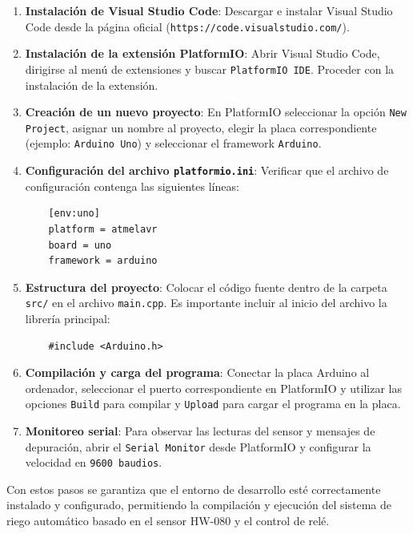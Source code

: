 \documentclass[conference]{IEEEtran}
\begin{document}
\begin{enumerate}
    \item \textbf{Instalación de Visual Studio Code}: 
    Descargar e instalar Visual Studio Code desde la página oficial (\texttt{https://code.visualstudio.com/}).

    \item \textbf{Instalación de la extensión PlatformIO}: 
    Abrir Visual Studio Code, dirigirse al menú de extensiones y buscar \texttt{PlatformIO IDE}. 
    Proceder con la instalación de la extensión.

    \item \textbf{Creación de un nuevo proyecto}: 
    En PlatformIO seleccionar la opción \texttt{New Project}, asignar un nombre al proyecto, 
    elegir la placa correspondiente (ejemplo: \texttt{Arduino Uno}) y seleccionar el framework \texttt{Arduino}.

    \item \textbf{Configuración del archivo \texttt{platformio.ini}}: 
    Verificar que el archivo de configuración contenga las siguientes líneas:
    \begin{verbatim}
    [env:uno]
    platform = atmelavr
    board = uno
    framework = arduino
    \end{verbatim}

    \item \textbf{Estructura del proyecto}: 
    Colocar el código fuente dentro de la carpeta \texttt{src/} en el archivo \texttt{main.cpp}. 
    Es importante incluir al inicio del archivo la librería principal:
    \begin{verbatim}
    #include <Arduino.h>
    \end{verbatim}

    \item \textbf{Compilación y carga del programa}: 
    Conectar la placa Arduino al ordenador, seleccionar el puerto correspondiente en PlatformIO 
    y utilizar las opciones \texttt{Build} para compilar y \texttt{Upload} para cargar el programa en la placa.

    \item \textbf{Monitoreo serial}: 
    Para observar las lecturas del sensor y mensajes de depuración, abrir el \texttt{Serial Monitor} 
    desde PlatformIO y configurar la velocidad en \texttt{9600 baudios}.
\end{enumerate}

Con estos pasos se garantiza que el entorno de desarrollo esté correctamente instalado y configurado, 
permitiendo la compilación y ejecución del sistema de riego automático basado en el sensor HW-080 y el control de relé.
\end{document}
